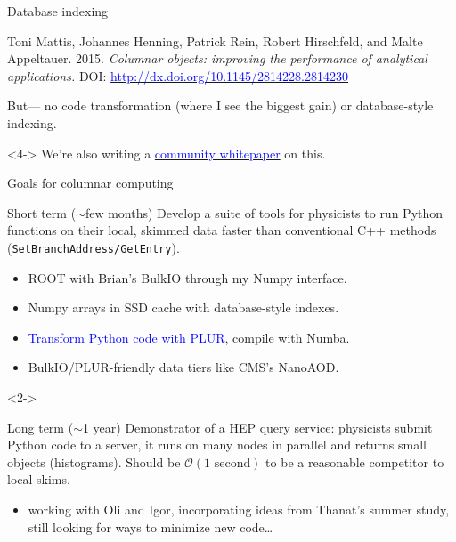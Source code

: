 \documentclass{beamer}
\begin{document}
\begin{frame}{Database indexing}
\begin{uncoverenv}
\begin{minipage}{\linewidth}
\scriptsize
Toni Mattis, Johannes Henning, Patrick Rein, Robert Hirschfeld, and Malte Appeltauer. 2015. {\it Columnar objects: improving the performance of analytical applications.} DOI: \href{http://dx.doi.org/10.1145/2814228.2814230}{\textcolor{blue}{http://dx.doi.org/10.1145/2814228.2814230}}
\end{minipage}

\vspace{0.1 cm}
But--- no code transformation (where I see the biggest gain) or database-style indexing.
\end{uncoverenv}

\vspace{0.35 cm}
\begin{uncoverenv}<4->
We're also writing a \href{https://docs.google.com/document/d/1-ZrnsS3IZdH91_pb99OLGd4gxaMm3m3Vr7XBigpx8DE/edit?usp=sharing}{\textcolor{blue}{community whitepaper}} on this.
\end{uncoverenv}
\end{frame}

\begin{frame}{Goals for columnar computing}
\vspace{0.2 cm}
\begin{block}{Short term ($\sim$few months)}
Develop a suite of tools for physicists to run Python functions on their local, skimmed data faster than conventional C++ methods ({\tt\small SetBranchAddress/GetEntry}).
\begin{itemize}
\item ROOT with Brian's BulkIO through my Numpy interface.
\item Numpy arrays in SSD cache with database-style indexes.
\item \href{https://github.com/diana-hep/plur}{\textcolor{blue}{Transform Python code with PLUR}}, compile with Numba.
\item BulkIO/PLUR-friendly data tiers like CMS's NanoAOD.
\end{itemize}
\end{block}

\vspace{-0.2 cm}
\begin{uncoverenv}<2->
\begin{block}{Long term ($\sim$1 year)}
Demonstrator of a HEP query service: physicists submit Python code to a server, it runs on many nodes in parallel and returns small objects (histograms). Should be $\mathcal{O}({\mbox{1 second}})$ to be a reasonable competitor to local skims.
\begin{itemize}
\item working with Oli and Igor, incorporating ideas from Thanat's summer study, still looking for ways to minimize new code\ldots
\end{itemize}
\end{block}
\end{uncoverenv}
\end{frame}
\end{document}

